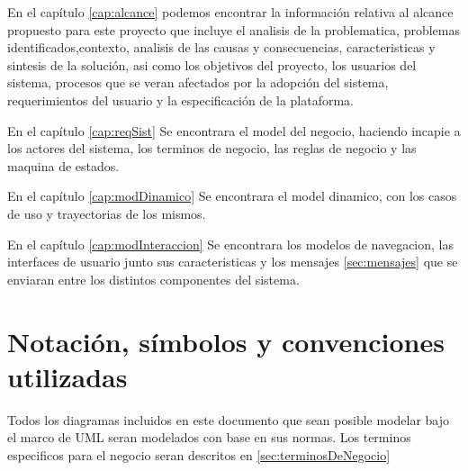 
En el capítulo \ref{cap:alcance} podemos encontrar la información relativa al alcance propuesto para este proyecto que incluye el analisis de la problematica, problemas identificados,contexto, analisis de las causas y consecuencias, caracteristicas y sintesis de la solución, asi como los objetivos del proyecto, los usuarios del sistema, procesos que se veran afectados por la adopción del sistema, requerimientos del usuario y la especificación de la plataforma.

En el capítulo \ref{cap:reqSist} Se encontrara el model del negocio, haciendo incapie a los actores del sistema, los terminos de negocio, las reglas de negocio y las maquina de estados.

En el capítulo \ref{cap:modDinamico} Se encontrara el model dinamico, con los casos de uso y trayectorias de los mismos.

En el capítulo \ref{cap:modInteraccion} Se encontrara los modelos de navegacion, las interfaces de usuario junto sus caracteristicas y los mensajes \ref{sec:mensajes} que se enviaran entre los distintos componentes del sistema.

\section{Notación, símbolos y convenciones utilizadas}

Todos los diagramas incluidos en este documento que sean posible modelar bajo el marco de UML seran modelados con base en sus normas.
Los terminos especificos para el negocio seran descritos en \ref{sec:terminosDeNegocio}
